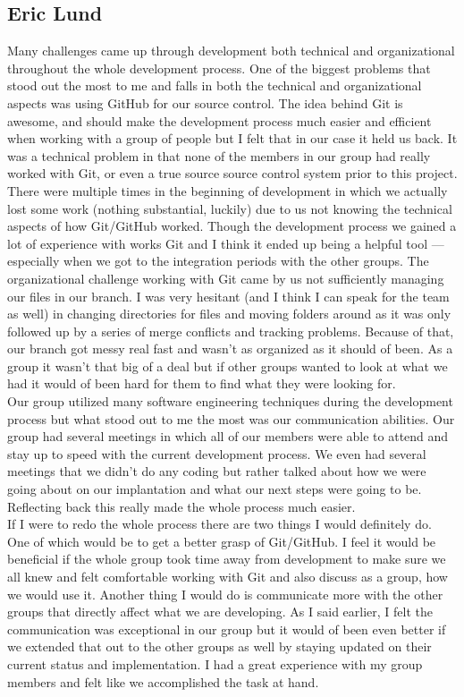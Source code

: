 \documentclass[12pt]{article}
\begin{document}
\subsection{Eric Lund}
\begin{changemargin}{1cm}{0cm} 
          Many challenges came up through development both technical and organizational throughout the whole development process. One of the biggest problems that stood out the most to me and falls in both the technical and organizational aspects was using GitHub for our source control.  The idea behind Git is awesome, and should make the development process much easier and efficient when working with a group of people but I felt that in our case it held us back. It was a technical problem in that none of the members in our group had really worked with Git, or even a true source source control system prior to this project. There were multiple times in the beginning of development in which we actually lost some work (nothing substantial, luckily) due to us not knowing the technical aspects of how Git/GitHub worked. Though the development process we gained a lot of experience with works Git and I think it ended up being a helpful tool — especially when we got to the integration periods with the other groups. The organizational challenge working with Git came by us not sufficiently managing our files in our branch. I was very hesitant (and I think I can speak for the team as well) in changing directories for files and moving folders around as it was only followed up by a series of merge conflicts and tracking problems. Because of that, our branch got messy real fast and wasn't as organized as it should of been. As a group it wasn't that big of a deal but if other groups wanted to look at what we had it would of been hard for them to find what they were looking for. \\
          
           Our group utilized many software engineering techniques during the development process but what stood out to me the most was our communication abilities. Our group had several meetings in which all of our members were able to attend and stay up to speed with the current development process. We even had several meetings that we didn't do any coding but rather talked about how we were going about on our implantation and what our next steps were going to be. Reflecting back this really made the whole process much easier.\\
           
           If I were to redo the whole process there are two things I would definitely do. One of which would be to get a better grasp of Git/GitHub. I feel it would be beneficial if the whole group took time away from development to make sure we all knew and felt comfortable working with Git and also discuss as a group, how we would use it. Another thing I would do is communicate more with the other groups that directly affect what we are developing. As I said earlier, I felt the communication was exceptional in our group but it would of been even better if we extended that out to the other groups as well by staying updated on their current status and implementation. I had a great experience with my group members and felt like we accomplished the task at hand. 
\end{changemargin} 
\end{document}
